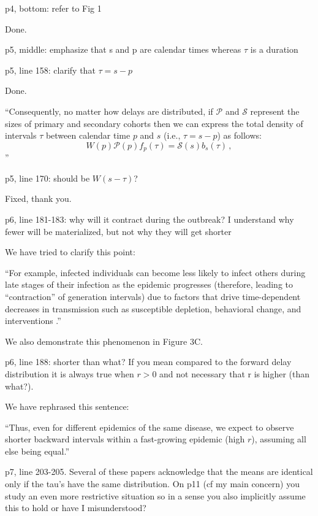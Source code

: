 \documentclass[12pt]{article}
\newcommand{\revtext}{\textsf}
\newcommand{\psymp}{\ensuremath{p}} %
\newcommand{\ssymp}{\ensuremath{s}} %
\newcommand{\psize}{{\mathcal P}} %
\newcommand{\ssize}{{\mathcal S}} %
\begin{document}
\revtext{p4, bottom: refer to Fig 1 }

Done.

\revtext{p5, middle: emphasize that s and p are calendar times whereas $\tau$ is a duration }

\revtext{p5, line 158: clarify that $\tau = s-p$}

Done.

``Consequently, no matter how delays are distributed, if
$\mathcal P$ and $\mathcal S$ represent the sizes of primary and
secondary cohorts then we can express the total density of intervals $\tau$ between calendar time $\psymp$ and $\ssymp$ (i.e., $\tau=\ssymp-\psymp$) as follows:
\begin{equation}
W(\psymp) \psize(\psymp) f_\psymp(\tau) = \ssize(\ssymp) b_\ssymp(\tau) \,,
\label{eq:match}
\end{equation}''

\revtext{p5, line 170: should be $W(s-\tau)$?}

Fixed, thank you.

\revtext{p6, line 181-183: why will it contract during the outbreak? I understand why fewer will be materialized, but not why they will get shorter}

We have tried to clarify this point:

``For example, infected individuals can become less likely to infect others during late stages of their infection as the epidemic progresses (therefore, leading to ``contraction'' of generation intervals) due to factors that drive time-dependent decreases in transmission such as susceptible depletion, behavioral change, and interventions \citep{champredon2015intrinsic}.''

We also demonstrate this phenomenon in Figure 3C.

\revtext{p6, line 188: shorter than what? If you mean compared to the forward delay distribution it is always true when $r>0$ and not necessary that r is higher (than what?).}

We have rephrased this sentence:

``Thus, even for different epidemics of the same disease, we expect to observe shorter backward intervals within a fast-growing epidemic (high $r$), assuming all else being equal.''

\revtext{p7, line 203-205. Several of these papers acknowledge that the means are identical only if the tau's have the same distribution. On p11 (cf my main concern) you study an even more restrictive situation so in a sense you also implicitly assume this to hold or have I misunderstood?}
\end{document}

